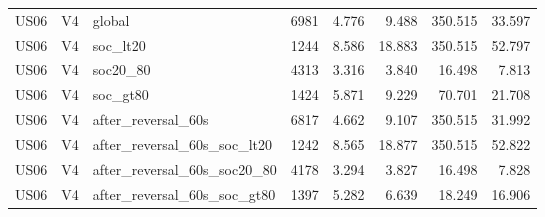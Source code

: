 \begin{tabular}{lllrrrrr}
US06 & V4 & global & 6981 & 4.776 & 9.488 & 350.515 & 33.597 \\
US06 & V4 & soc\_lt20 & 1244 & 8.586 & 18.883 & 350.515 & 52.797 \\
US06 & V4 & soc20\_80 & 4313 & 3.316 & 3.840 & 16.498 & 7.813 \\
US06 & V4 & soc\_gt80 & 1424 & 5.871 & 9.229 & 70.701 & 21.708 \\
US06 & V4 & after\_reversal\_60s & 6817 & 4.662 & 9.107 & 350.515 & 31.992 \\
US06 & V4 & after\_reversal\_60s\_soc\_lt20 & 1242 & 8.565 & 18.877 & 350.515 & 52.822 \\
US06 & V4 & after\_reversal\_60s\_soc20\_80 & 4178 & 3.294 & 3.827 & 16.498 & 7.828 \\
US06 & V4 & after\_reversal\_60s\_soc\_gt80 & 1397 & 5.282 & 6.639 & 18.249 & 16.906 \\
\hline
\end{tabular}
